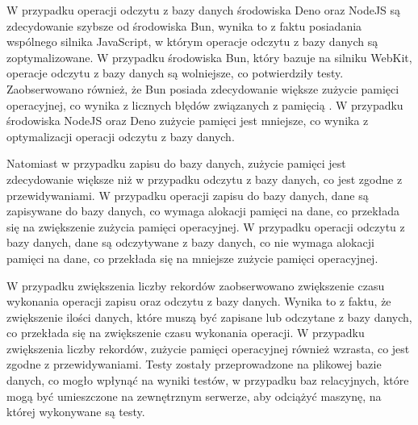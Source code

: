 W przypadku operacji odczytu z bazy danych środowiska Deno oraz NodeJS są zdecydowanie szybsze od środowiska Bun, wynika to z faktu posiadania wspólnego silnika JavaScript, w którym operacje odczytu z bazy danych są zoptymalizowane. W przypadku środowiska Bun, który bazuje na silniku WebKit, operacje odczytu z bazy danych są wolniejsze, co potwierdziły testy. Zaobserwowano również, że Bun posiada zdecydowanie większe zużycie pamięci operacyjnej, co wynika z licznych błędów związanych z pamięcią \cite{bun_memory}. W przypadku środowiska NodeJS oraz Deno zużycie pamięci jest mniejsze, co wynika z optymalizacji operacji odczytu z bazy danych.

Natomiast w przypadku zapisu do bazy danych, zużycie pamięci jest zdecydowanie większe niż w przypadku odczytu z bazy danych, co jest zgodne z przewidywaniami. W przypadku operacji zapisu do bazy danych, dane są zapisywane do bazy danych, co wymaga alokacji pamięci na dane, co przekłada się na zwiększenie zużycia pamięci operacyjnej. W przypadku operacji odczytu z bazy danych, dane są odczytywane z bazy danych, co nie wymaga alokacji pamięci na dane, co przekłada się na mniejsze zużycie pamięci operacyjnej.

W przypadku zwiększenia liczby rekordów zaobserwowano zwiększenie czasu wykonania operacji zapisu oraz odczytu z bazy danych. Wynika to z faktu, że zwiększenie ilości danych, które muszą być zapisane lub odczytane z bazy danych, co przekłada się na zwiększenie czasu wykonania operacji. W przypadku zwiększenia liczby rekordów, zużycie pamięci operacyjnej również wzrasta, co jest zgodne z przewidywaniami. Testy zostały przeprowadzone na plikowej bazie danych, co mogło wpłynąć na wyniki testów, w przypadku baz relacyjnych, które mogą być umieszczone na zewnętrznym serwerze, aby odciążyć maszynę, na której wykonywane są testy.
